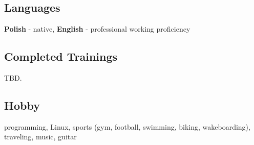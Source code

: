 \documentclass{article}
\begin{document}
    \subsection*{Languages}
    \textbf{Polish} - native, \textbf{English} - professional working proficiency
    
    \subsection*{Completed Trainings}
    TBD.
    
    \subsection*{Hobby}
    programming, Linux, sports (gym, football, swimming, biking, wakeboarding), traveling, music, guitar
    
\end{document}
